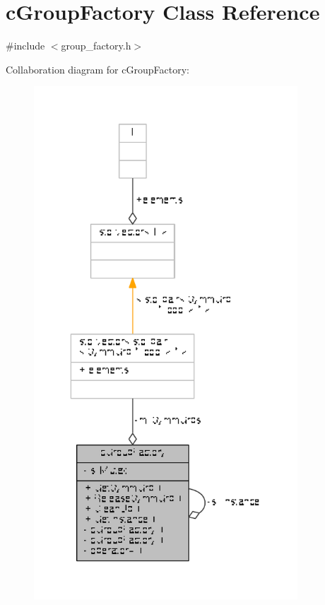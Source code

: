 \hypertarget{classcGroupFactory}{\section{c\-Group\-Factory Class Reference}
\label{classcGroupFactory}
}


{\ttfamily \#include $<$group\-\_\-factory.\-h$>$}



Collaboration diagram for c\-Group\-Factory\-:
\nopagebreak
\begin{figure}[H]
\begin{center}
\leavevmode
\includegraphics[width=280pt]{classcGroupFactory__coll__graph}
\end{center}
\end{figure}
